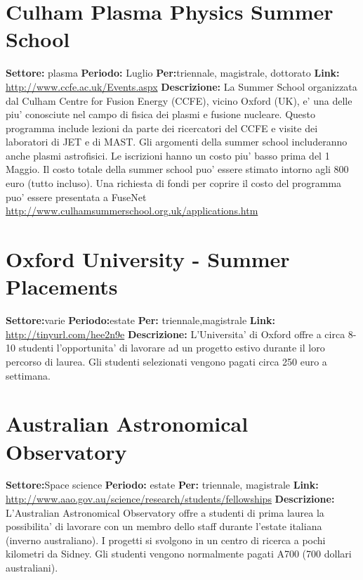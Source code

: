 \documentclass[a4paper,10pt]{article}
\begin{document}
\section{Culham Plasma Physics Summer School}
\textbf{Settore:} plasma \newline
\textbf{Periodo:} Luglio\newline
\textbf{Per:}triennale, magistrale, dottorato\newline
\textbf{Link:} \url{http://www.ccfe.ac.uk/Events.aspx} \newline
\textbf{Descrizione:}  	La Summer School organizzata dal Culham Centre for Fusion Energy (CCFE), vicino Oxford (UK), e' una delle piu' conosciute nel campo di fisica dei plasmi e fusione nucleare. Questo programma include lezioni da parte dei ricercatori del CCFE e visite dei laboratori di JET e di MAST. Gli argomenti della summer school includeranno anche plasmi astrofisici. Le iscrizioni hanno un costo piu' basso prima del 1 Maggio. Il costo totale della summer school puo' essere stimato intorno agli 800 euro (tutto incluso). Una richiesta di fondi per coprire il costo del programma puo' essere presentata a FuseNet \url{http://www.culhamsummerschool.org.uk/applications.htm} 	

\section{Oxford University - Summer Placements}
\textbf{Settore:}varie \newline
\textbf{Periodo:}estate \newline
\textbf{Per:} triennale,magistrale\newline
\textbf{Link:} \url{http://tinyurl.com/hee2n9e} \newline
\textbf{Descrizione:} L'Universita' di Oxford offre a circa 8-10 studenti l'opportunita' di lavorare ad un progetto estivo durante il loro percorso di laurea. Gli studenti selezionati vengono pagati circa 250 euro a settimana.	

\section{Australian Astronomical Observatory}
\textbf{Settore:}Space science \newline
\textbf{Periodo:} estate\newline
\textbf{Per:} triennale, magistrale\newline
\textbf{Link:} \url{http://www.aao.gov.au/science/research/students/fellowships} \newline
\textbf{Descrizione:} L'Australian Astronomical Observatory offre a studenti di prima laurea la possibilita' di lavorare con un membro dello staff durante l'estate italiana (inverno australiano). I progetti si svolgono in un centro di ricerca a pochi kilometri da Sidney. Gli studenti vengono normalmente pagati A700 (700 dollari australiani). 	
\end{document}
